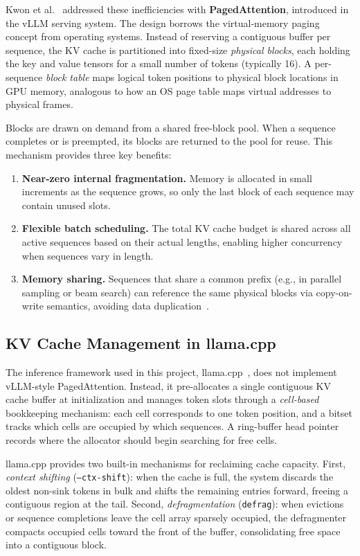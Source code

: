 \documentclass[
english,                 %
bibtex,                  %
]{kththesis}
\numberwithin{listing}{chapter}
\begin{document}
Kwon et al.~\cite{kwon2023efficient} addressed these inefficiencies with \textbf{PagedAttention}, introduced in the vLLM serving system. The design borrows the virtual-memory paging concept from operating systems. Instead of reserving a contiguous buffer per sequence, the \gls{KV} cache is partitioned into fixed-size \textit{physical blocks}, each holding the key and value tensors for a small number of tokens (typically 16). A per-sequence \textit{block table} maps logical token positions to physical block locations in \gls{GPU} memory, analogous to how an OS page table maps virtual addresses to physical frames.

Blocks are drawn on demand from a shared free-block pool. When a sequence completes or is preempted, its blocks are returned to the pool for reuse. This mechanism provides three key benefits:

\begin{enumerate}
  \item \textbf{Near-zero internal fragmentation.} Memory is allocated in small increments as the sequence grows, so only the last block of each sequence may contain unused slots.
  \item \textbf{Flexible batch scheduling.} The total \gls{KV} cache budget is shared across all active sequences based on their actual lengths, enabling higher concurrency when sequences vary in length.
  \item \textbf{Memory sharing.} Sequences that share a common prefix (e.g., in parallel sampling or beam search) can reference the same physical blocks via copy-on-write semantics, avoiding data duplication~\cite{kwon2023efficient}.
\end{enumerate}

\subsection{KV Cache Management in llama.cpp}
\label{sec:bg-llamacpp-kv}
The inference framework used in this project, llama.cpp~\cite{llamacpp2025}, does not implement vLLM-style PagedAttention. Instead, it pre-allocates a single contiguous \gls{KV} cache buffer at initialization and manages token slots through a \textit{cell-based} bookkeeping mechanism: each cell corresponds to one token position, and a bitset tracks which cells are occupied by which sequences. A ring-buffer head pointer records where the allocator should begin searching for free cells.

llama.cpp provides two built-in mechanisms for reclaiming cache capacity. First, \textit{context shifting} (\texttt{--ctx-shift}): when the cache is full, the system discards the oldest non-sink tokens in bulk and shifts the remaining entries forward, freeing a contiguous region at the tail. Second, \textit{defragmentation} (\texttt{defrag}): when evictions or sequence completions leave the cell array sparsely occupied, the defragmenter compacts occupied cells toward the front of the buffer, consolidating free space into a contiguous block.
\end{document}
